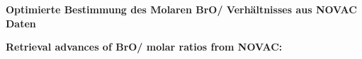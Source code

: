 \thispagestyle{empty}
\begin{center}
  \begin{minipage}[c][0.48\textheight][b]{0.9\textwidth}
    \small
    \textbf{
      Optimierte Bestimmung des Molaren BrO/ Verhältnisses aus NOVAC Daten
    }\par
    \vspace{\baselineskip}
    
  \end{minipage}\par
  \vfill
  \begin{minipage}[c][0.48\textheight][b]{0.9\textwidth}
    \small
    \textbf{
      Retrieval advances of BrO/ molar ratios from NOVAC:
    }\par
    \vspace{\baselineskip}
    
  \end{minipage}
\end{center}
